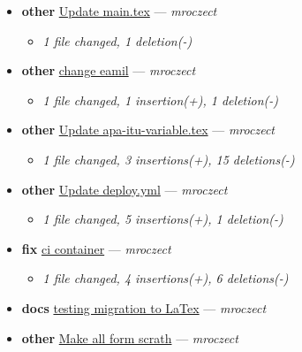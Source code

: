 \begin{itemize}[leftmargin=1.5em]
\begin{itemize}[leftmargin=1.5em]
  \end{itemize}
  \item \textbf{other} \href{https://github.com/mroczect/mroczect.github.io/commit/aab508c4f640d96d2cb0c99250ebdd24a53ff539}{Update main.tex} --- \textit{mroczect}
  \begin{itemize}[leftmargin=1.5em]
    \item \small\textit{1 file changed, 1 deletion(-)}
  \end{itemize}
  \item \textbf{other} \href{https://github.com/mroczect/mroczect.github.io/commit/10dcba6460f99c24d784dd94a029f2f87d26c463}{change eamil} --- \textit{mroczect}
  \begin{itemize}[leftmargin=1.5em]
    \item \small\textit{1 file changed, 1 insertion(+), 1 deletion(-)}
  \end{itemize}
  \item \textbf{other} \href{https://github.com/mroczect/mroczect.github.io/commit/f2ec89fb7a9015aa51c4213835d9e04f9e72cce4}{Update apa-itu-variable.tex} --- \textit{mroczect}
  \begin{itemize}[leftmargin=1.5em]
    \item \small\textit{1 file changed, 3 insertions(+), 15 deletions(-)}
  \end{itemize}
  \item \textbf{other} \href{https://github.com/mroczect/mroczect.github.io/commit/07558ee54cd337617976ae7fd6fcb8e5d0ce7819}{Update deploy.yml} --- \textit{mroczect}
  \begin{itemize}[leftmargin=1.5em]
    \item \small\textit{1 file changed, 5 insertions(+), 1 deletion(-)}
  \end{itemize}
  \item \textbf{fix} \href{https://github.com/mroczect/mroczect.github.io/commit/f8277399f821a4dda9be6452ba5f4b9439a370fd}{ci container} --- \textit{mroczect}
  \begin{itemize}[leftmargin=1.5em]
    \item \small\textit{1 file changed, 4 insertions(+), 6 deletions(-)}
  \end{itemize}
  \item \textbf{docs} \href{https://github.com/mroczect/mroczect.github.io/commit/9b40db8f911c0e73aa7dcabaef70bf77f41cc440}{testing migration to LaTex} --- \textit{mroczect}
  \item \textbf{other} \href{https://github.com/mroczect/mroczect.github.io/commit/178501963a561014264b8afcf87f38005cacc1a6}{Make all form scrath} --- \textit{mroczect}
\end{itemize}

